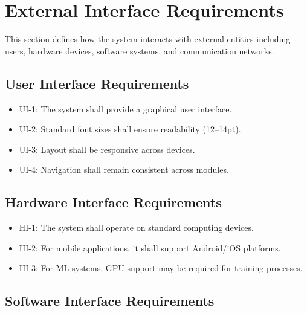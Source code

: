 \section{External Interface Requirements}

This section defines how the system interacts with external entities including 
users, hardware devices, software systems, and communication networks.


\subsection{User Interface Requirements}

\begin{itemize}
\item UI-1: The system shall provide a graphical user interface.
\item UI-2: Standard font sizes shall ensure readability (12–14pt).
\item UI-3: Layout shall be responsive across devices.
\item UI-4: Navigation shall remain consistent across modules.
\end{itemize}


\subsection{Hardware Interface Requirements}

\begin{itemize}
\item HI-1: The system shall operate on standard computing devices.
\item HI-2: For mobile applications, it shall support Android/iOS platforms.
\item HI-3: For ML systems, GPU support may be required for training processes.
\end{itemize}


\subsection{Software Interface Requirements}


